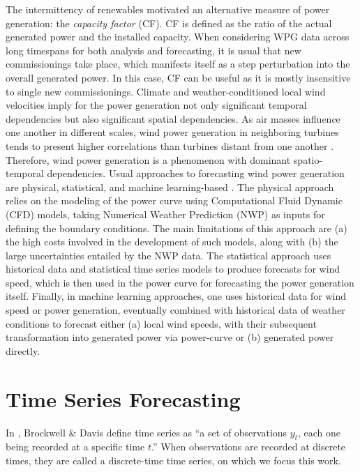 The intermittency of renewables motivated an alternative measure of power generation: the \textit{capacity factor} (CF).
CF is defined as the ratio of the actual generated power and the installed capacity. When considering WPG data across long timespans for both analysis and forecasting, it is usual that new commissionings take place, which manifests itself as a step perturbation into the overall generated power. In this case, CF can be useful as it is mostly insensitive to single new commissionings.
Climate and weather-conditioned local wind velocities imply for the power generation not only significant temporal dependencies but also significant spatial dependencies. As air masses influence one another in different scales, wind power generation in neighboring turbines tends to present higher correlations than turbines distant from one another \cite{engeland2017variability}. Therefore, wind power generation is a phenomenon with dominant spatio-temporal dependencies.
Usual approaches to forecasting wind power generation are physical, statistical, and machine learning-based \cite{jung2014forecasting}. The physical approach relies on the modeling of the power curve using Computational Fluid Dynamic (CFD) models, taking Numerical Weather Prediction (NWP) as inputs for defining the boundary conditions. The main limitations of this approach are (a) the high costs involved in the development of such models, along with (b) the large uncertainties entailed by the NWP data. The statistical approach uses historical data and statistical time series models to produce forecasts for wind speed, which is then used in the power curve for forecasting the power generation itself. Finally, in machine learning approaches, one uses historical data for wind speed or power generation, eventually combined with historical data of weather conditions to forecast either (a) local wind speeds, with their subsequent transformation into generated power via power-curve or (b) generated power directly.

\section{Time Series Forecasting}

In \cite{brockwell1996introduction}, Brockwell \& Davis define time series as ``a set of observations $y_t$, each one being recorded at a specific time $t$.'' When observations are recorded at discrete times, they are called a discrete-time time series, on which we focus this work.

